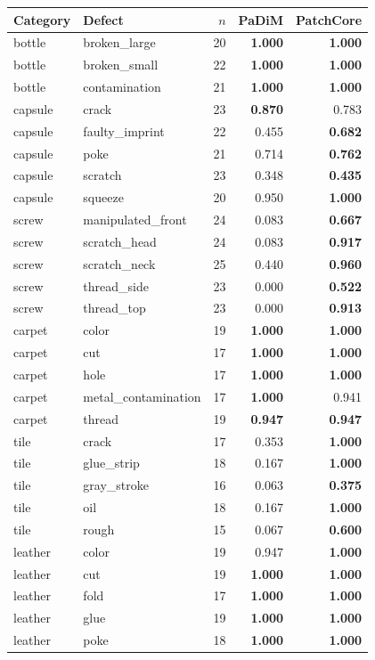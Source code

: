 \begin{tabular}{@{}l@{\hspace{4pt}}l@{\hspace{4pt}}rrr@{}}
\toprule
Category & Defect & $n$ & PaDiM & PatchCore \\
\midrule
bottle & broken\_large & 20 & \textbf{1.000} & \textbf{1.000} \\
bottle & broken\_small & 22 & \textbf{1.000} & \textbf{1.000} \\
bottle & contamination & 21 & \textbf{1.000} & \textbf{1.000} \\
\midrule
capsule & crack & 23 & \textbf{0.870} & 0.783 \\
capsule & faulty\_imprint & 22 & 0.455 & \textbf{0.682} \\
capsule & poke & 21 & 0.714 & \textbf{0.762} \\
capsule & scratch & 23 & 0.348 & \textbf{0.435} \\
capsule & squeeze & 20 & 0.950 & \textbf{1.000} \\
\midrule
screw & manipulated\_front & 24 & 0.083 & \textbf{0.667} \\
screw & scratch\_head & 24 & 0.083 & \textbf{0.917} \\
screw & scratch\_neck & 25 & 0.440 & \textbf{0.960} \\
screw & thread\_side & 23 & 0.000 & \textbf{0.522} \\
screw & thread\_top & 23 & 0.000 & \textbf{0.913} \\
\midrule
carpet & color & 19 & \textbf{1.000} & \textbf{1.000} \\
carpet & cut & 17 & \textbf{1.000} & \textbf{1.000} \\
carpet & hole & 17 & \textbf{1.000} & \textbf{1.000} \\
carpet & metal\_contamination & 17 & \textbf{1.000} & 0.941 \\
carpet & thread & 19 & \textbf{0.947} & \textbf{0.947} \\
\midrule
tile & crack & 17 & 0.353 & \textbf{1.000} \\
tile & glue\_strip & 18 & 0.167 & \textbf{1.000} \\
tile & gray\_stroke & 16 & 0.063 & \textbf{0.375} \\
tile & oil & 18 & 0.167 & \textbf{1.000} \\
tile & rough & 15 & 0.067 & \textbf{0.600} \\
\midrule
leather & color & 19 & 0.947 & \textbf{1.000} \\
leather & cut & 19 & \textbf{1.000} & \textbf{1.000} \\
leather & fold & 17 & \textbf{1.000} & \textbf{1.000} \\
leather & glue & 19 & \textbf{1.000} & \textbf{1.000} \\
leather & poke & 18 & \textbf{1.000} & \textbf{1.000} \\
\bottomrule
\end{tabular}
